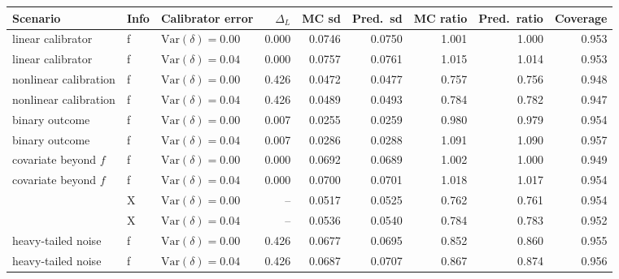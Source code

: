 \begin{tabular}{lllrrrrrr}
\toprule
Scenario & Info & Calibrator error & $\Delta_L$ & MC sd & Pred.\ sd & MC ratio & Pred.\ ratio & Coverage \\
\midrule
linear calibrator & f & $\mathrm{Var}(\delta){=}0.00$ & 0.000 & 0.0746 & 0.0750 & 1.001 & 1.000 & 0.953 \\
linear calibrator & f & $\mathrm{Var}(\delta){=}0.04$ & 0.000 & 0.0757 & 0.0761 & 1.015 & 1.014 & 0.953 \\
nonlinear calibration & f & $\mathrm{Var}(\delta){=}0.00$ & 0.426 & 0.0472 & 0.0477 & 0.757 & 0.756 & 0.948 \\
nonlinear calibration & f & $\mathrm{Var}(\delta){=}0.04$ & 0.426 & 0.0489 & 0.0493 & 0.784 & 0.782 & 0.947 \\
binary outcome & f & $\mathrm{Var}(\delta){=}0.00$ & 0.007 & 0.0255 & 0.0259 & 0.980 & 0.979 & 0.954 \\
binary outcome & f & $\mathrm{Var}(\delta){=}0.04$ & 0.007 & 0.0286 & 0.0288 & 1.091 & 1.090 & 0.957 \\
covariate beyond $f$ & f & $\mathrm{Var}(\delta){=}0.00$ & 0.000 & 0.0692 & 0.0689 & 1.002 & 1.000 & 0.949 \\
covariate beyond $f$ & f & $\mathrm{Var}(\delta){=}0.04$ & 0.000 & 0.0700 & 0.0701 & 1.018 & 1.017 & 0.954 \\
 & X & $\mathrm{Var}(\delta){=}0.00$ & -- & 0.0517 & 0.0525 & 0.762 & 0.761 & 0.954 \\
 & X & $\mathrm{Var}(\delta){=}0.04$ & -- & 0.0536 & 0.0540 & 0.784 & 0.783 & 0.952 \\
heavy-tailed noise & f & $\mathrm{Var}(\delta){=}0.00$ & 0.426 & 0.0677 & 0.0695 & 0.852 & 0.860 & 0.955 \\
heavy-tailed noise & f & $\mathrm{Var}(\delta){=}0.04$ & 0.426 & 0.0687 & 0.0707 & 0.867 & 0.874 & 0.956 \\
\bottomrule
\end{tabular}
